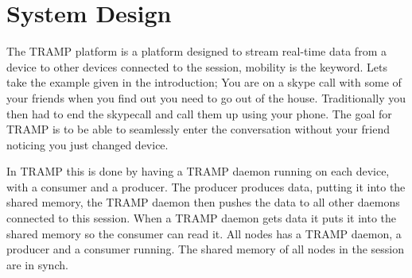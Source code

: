\section{System Design}
\label{sec:design}


The TRAMP platform is a platform designed to stream real-time data from a device to other devices connected to the session, mobility is the keyword. Lets take the example given in the introduction; You are on a skype call with some of your friends when you find out you need to go out of the house. Traditionally you then had to end the skypecall and call them up using your phone. The goal for TRAMP is to be able to seamlessly enter the conversation without your friend noticing you just changed device.

In TRAMP this is done by having a TRAMP daemon running on each device, with a consumer and a producer. The producer produces data, putting it into the shared memory, the TRAMP daemon then pushes the data to all other daemons connected to this session. When a TRAMP daemon gets data it puts it into the shared memory so the consumer can read it. All nodes has a TRAMP daemon, a producer and a consumer running. The shared memory of all nodes in the session are in synch.

